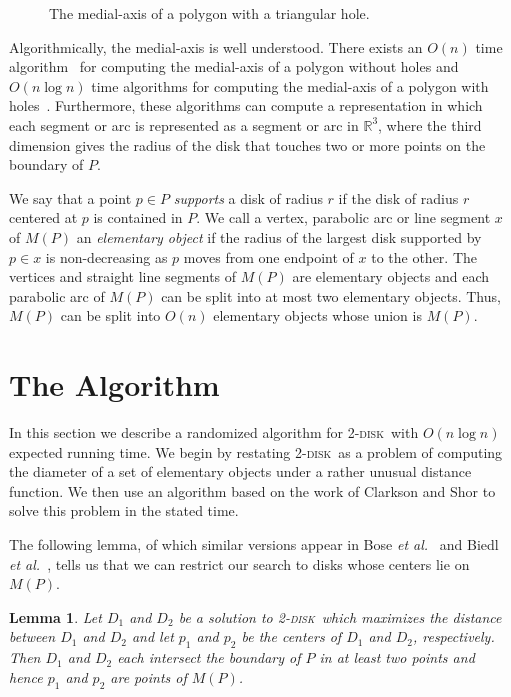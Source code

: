 \documentclass[twoside]{report}
\newcommand{\centeripe}[1]{\begin{center}\Ipe{#1}\end{center}}
\newcommand{\etal}{\emph{et al.}}
\newtheorem{lem}{Lemma}
\newcommand{\seclabel}[1]{\label{sec:#1}}
\newcommand{\figlabel}[1]{\label{fig:#1}}
\newcommand{\tdisk}{\textsc{2-disk}}
\begin{document}
\begin{paper}
\begin{figure}
\centeripe{testing}
\caption{The medial-axis of a polygon with a triangular hole.}
\figlabel{medial-axis}
\end{figure}

Algorithmically, the medial-axis is well understood. There exists an
$O(n)$ time algorithm~\cite{csw99} for computing the medial-axis of a
polygon without holes and $O(n\log n)$ time algorithms for computing
the medial-axis of a polygon with holes~\cite{as-vdco-95}.
Furthermore, these algorithms can compute a representation in which
each segment or arc is represented as a segment or arc in
$\mathbb{R}^3$, where the third dimension gives the radius of the disk
that touches two or more points on the boundary of $P$.

We say that a point $p\in P$ \emph{supports} a disk of radius $r$ if
the disk of radius $r$ centered at $p$ is contained in $P$.  We call a
vertex, parabolic arc or line segment $x$ of $M(P)$ an
\emph{elementary object} if the radius of the largest disk supported
by $p\in x$ is non-decreasing as $p$ moves from one endpoint of $x$ to
the other.  The vertices and straight line segments of $M(P)$ are
elementary objects and each parabolic arc of $M(P)$ can be split into
at most two elementary objects.  Thus, $M(P)$ can be split into $O(n)$
elementary objects whose union is $M(P)$.

\section{The Algorithm}\seclabel{algorithm}

In this section we describe a randomized algorithm for \tdisk\ with
$O(n\log n)$ expected running time. We begin by restating \tdisk\ as a
problem of computing the diameter of a set of elementary objects under
a rather unusual distance function. We then use an algorithm based on
the work of Clarkson and Shor \cite{cs88} to solve this problem in the
stated time.

The following lemma, of which similar versions appear in Bose \etal\ 
\cite{bckm98} and Biedl \etal\ \cite{bddlt98}, tells us that we can
restrict our search to disks whose centers lie on $M(P)$.

\begin{lem}\label{l:restrict}
  Let $D_1$ and $D_2$ be a solution to \tdisk\ which maximizes the
  distance between $D_1$ and $D_2$ and let $p_1$ and $p_2$ be the
  centers of $D_1$ and $D_2$, respectively.  Then $D_1$ and $D_2$ each
  intersect the boundary of $P$ in at least two points and hence $p_1$
  and $p_2$ are points of $M(P)$.
\end{lem}


\end{paper}
\end{document}

